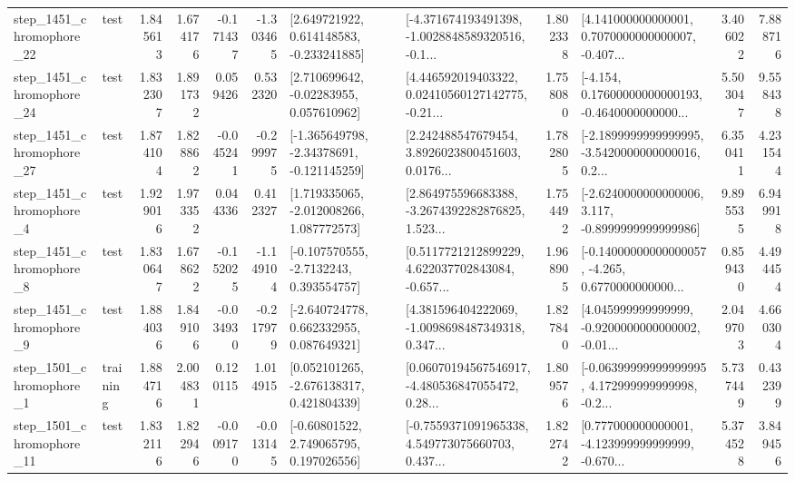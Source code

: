 \begin{tabular}{llrrrrllrlrr}
 step\_1451\_chromophore\_22 &      test &      1.845613 &    1.674176 &     -0.171437 & -1.303465 &    [2.649721922, 0.614148583, -0.233241885] &  [-4.371674193491398, -1.0028848589320516, -0.1... &       1.802338 &  [4.141000000000001, 0.7070000000000007, -0.407... &            3.406022 &          7.888716 \\
 step\_1451\_chromophore\_24 &      test &      1.832307 &    1.891732 &      0.059426 &  0.532320 &     [2.710699642, -0.02283955, 0.057610962] &  [4.446592019403322, 0.02410560127142775, -0.21... &       1.758080 &  [-4.154, 0.17600000000000193, -0.4640000000000... &            5.503047 &          9.558438 \\
 step\_1451\_chromophore\_27 &      test &      1.874104 &    1.828862 &     -0.045241 & -0.299975 &   [-1.365649798, -2.34378691, -0.121145259] &  [2.242488547679454, 3.8926023800451603, 0.0176... &       1.782805 &  [-2.1899999999999995, -3.5420000000000016, 0.2... &            6.350411 &          4.231544 \\
  step\_1451\_chromophore\_4 &      test &      1.929016 &    1.973352 &      0.044336 &  0.412327 &    [1.719335065, -2.012008266, 1.087772573] &  [2.864975596683388, -3.2674392282876825, 1.523... &       1.754492 &  [-2.6240000000000006, 3.117, -0.8999999999999986] &            9.895535 &          6.949918 \\
  step\_1451\_chromophore\_8 &      test &      1.830647 &    1.678622 &     -0.152025 & -1.149104 &     [-0.107570555, -2.7132243, 0.393554757] &  [0.5117721212899229, 4.622037702843084, -0.657... &       1.968905 &  [-0.14000000000000057, -4.265, 0.6770000000000... &            0.859430 &          4.494454 \\
  step\_1451\_chromophore\_9 &      test &      1.884036 &    1.849106 &     -0.034930 & -0.217979 &    [-2.640724778, 0.662332955, 0.087649321] &  [4.381596404222069, -1.0098698487349318, 0.347... &       1.827840 &  [4.045999999999999, -0.9200000000000002, -0.01... &            2.049703 &          4.660304 \\
  step\_1501\_chromophore\_1 &  training &      1.884716 &    2.004831 &      0.120115 &  1.014915 &    [0.052101265, -2.676138317, 0.421804339] &  [0.06070194567546917, -4.480536847055472, 0.28... &       1.809576 &  [-0.06399999999999995, 4.172999999999998, -0.2... &            5.737449 &          0.432399 \\
 step\_1501\_chromophore\_11 &      test &      1.832116 &    1.822946 &     -0.009170 & -0.013145 &     [-0.60801522, 2.749065795, 0.197026556] &  [-0.7559371091965338, 4.549773075660703, 0.437... &       1.822742 &  [0.777000000000001, -4.123999999999999, -0.670... &            5.374528 &          3.849456 \\

\end{tabular}
